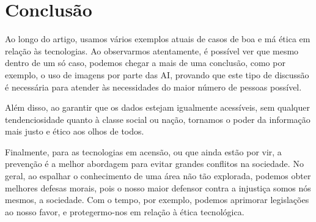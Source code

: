 \documentclass[referee,sn-basic]{sn-jnl}
\theoremstyle{thmstyleone}%
\begin{document}
\section{Conclusão}
Ao longo do artigo, usamos vários exemplos atuais de casos de boa e má ética em relação às tecnologias. Ao observarmos atentamente, é possível ver que mesmo dentro de um só caso, podemos chegar a mais de uma conclusão, como por exemplo, o uso de imagens por parte das AI, provando que este tipo de discussão é necessária para atender às necessidades do maior número de pessoas possível.\par
Além disso, ao garantir que os dados estejam igualmente acessíveis, sem qualquer tendenciosidade quanto à classe social ou nação, tornamos o poder da informação mais justo e ético aos olhos de todos.\par
Finalmente, para as tecnologias em acensão, ou que ainda estão por vir, a prevenção é a melhor abordagem para evitar grandes conflitos na sociedade. No geral, ao espalhar o conhecimento de uma área não tão explorada, podemos obter melhores defesas morais, pois o nosso maior defensor contra a injustiça somos nós mesmos, a sociedade. Com o tempo, por exemplo, podemos aprimorar legislações ao nosso favor, e protegermo-nos em relação à ética tecnológica.


\end{document}
